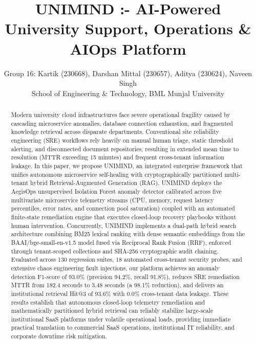 \documentclass[12pt,onecolumn,draftclsnofoot]{IEEEtran}
\begin{document}
\title{UNIMIND :- AI-Powered University Support, Operations \& AIOps Platform}

\author{Group 16: Kartik (230668), Darshan Mittal (230657), Aditya (230624), Naveen Singh\\
School of Engineering \& Technology, BML Munjal University}

\maketitle

\begin{abstract}
Modern university cloud infrastructures face severe operational fragility caused by cascading microservice anomalies, database connection exhaustion, and fragmented knowledge retrieval across disparate departments. Conventional site reliability engineering (SRE) workflows rely heavily on manual human triage, static threshold alerting, and disconnected document repositories, resulting in extended mean time to resolution (MTTR exceeding 15 minutes) and frequent cross-tenant information leakage. In this paper, we propose UNIMIND, an integrated enterprise framework that unifies autonomous microservice self-healing with cryptographically partitioned multi-tenant hybrid Retrieval-Augmented Generation (RAG). UNIMIND deploys the AegisOps unsupervised Isolation Forest anomaly detector calibrated across five multivariate microservice telemetry streams (CPU, memory, request latency percentiles, error rates, and connection pool saturation) coupled with an automated finite-state remediation engine that executes closed-loop recovery playbooks without human intervention. Concurrently, UNIMIND implements a dual-path hybrid search architecture combining BM25 lexical ranking with dense semantic embeddings from the BAAI/bge-small-en-v1.5 model fused via Reciprocal Rank Fusion (RRF), enforced through tenant-scoped collections and SHA-256 cryptographic audit chaining. Evaluated across 130 regression suites, 18 automated cross-tenant security probes, and extensive chaos engineering fault injections, our platform achieves an anomaly detection F1-score of 93.0\% (precision 94.2\%, recall 91.8\%), reduces SRE remediation MTTR from 182.4 seconds to 3.48 seconds (a 98.1\% reduction), and delivers an institutional retrieval Hit@3 of 93.6\% with 0.0\% cross-tenant data leakage. These results establish that autonomous closed-loop telemetry remediation and mathematically partitioned hybrid retrieval can reliably stabilize large-scale institutional SaaS platforms under volatile operational loads, providing immediate practical translation to commercial SaaS operations, institutional IT reliability, and corporate downtime risk mitigation.
\end{abstract}
\end{document}
